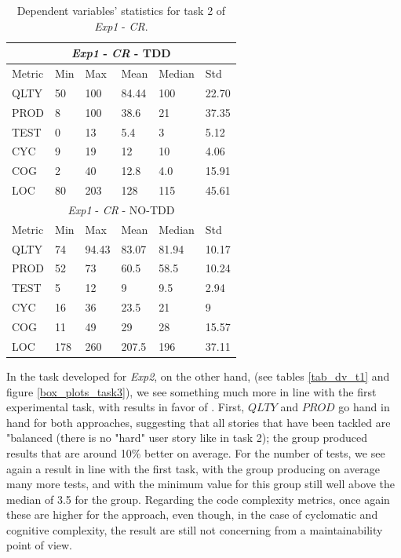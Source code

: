 \begin{table}[H]
    \begin{center} 
        \begin{tabular}{ |p{2cm}||p{1.6cm}|p{1.6cm}|p{1.6cm}|p{1.6cm}|p{1.6cm}|}
            \hline
                \multicolumn{6}{|c|}{\textit{Exp1} - \textit{CR} - TDD} \\
            \hline
                Metric & Min & Max & Mean & Median & Std\\
            \hline
                QLTY & 50 & 100 & 84.44 & 100 & 22.70 \\
                PROD & 8 & 100 & 38.6 & 21 & 37.35 \\
                TEST & 0 & 13 & 5.4 & 3 & 5.12 \\
                CYC & 9 & 19 & 12 & 10 & 4.06 \\
                COG & 2 & 40 & 12.8 & 4.0 & 15.91 \\
                LOC & 80 & 203 & 128 & 115 & 45.61 \\
            \hline\hline
                \multicolumn{6}{|c|}{\textit{Exp1} - \textit{CR} - NO-TDD} \\
            \hline
                Metric & Min & Max & Mean & Median & Std\\
            \hline
                QLTY & 74 & 94.43 & 83.07 & 81.94 & 10.17 \\
                PROD & 52 & 73 & 60.5 & 58.5 & 10.24 \\
                TEST & 5 & 12 & 9 & 9.5 & 2.94 \\
                CYC & 16 & 36 & 23.5 & 21 & 9 \\
                COG & 11 & 49 & 29 & 28 & 15.57 \\
                LOC & 178 & 260 & 207.5 & 196 & 37.11 \\
            \hline
        \end{tabular}
        \caption{\label{tab_dv_t2}Dependent variables' statistics for task 2 of \textit{Exp1} - \textit{CR}.}
    \end{center}
\end{table}

In the task developed for \textit{Exp2}, on the other hand, (see tables \ref{tab_dv_t1} and figure \ref{box_plots_task3}), we see something much more in line with the first experimental task, with results in favor of \tdd.
First, $QLTY$ and $PROD$ go hand in hand for both approaches, suggesting that all stories that have been tackled are "balanced (\ie there is no "hard" user story like in task 2); the \tdd group produced results that are around 10\% better on average.
For the number of tests, we see again a result in line with the first task, with the \tdd group producing on average many more tests, and with the minimum value for this group still well above the median of 3.5 for the \notdd group.
Regarding the code complexity metrics, once again these are higher for the \tdd approach, even though, in the case of cyclomatic and cognitive complexity, the result are still not concerning from a maintainability point of view.

